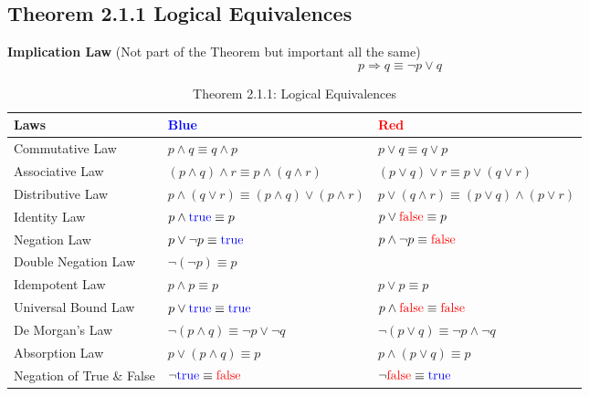 \documentclass{article}
\theoremstyle{plain}
\theoremstyle{definition}
\theoremstyle{remark}
\begin{document}
\subsection{Theorem 2.1.1 Logical Equivalences}

\textbf{Implication Law} (Not part of the Theorem but important all the same)
\[ p \Rightarrow q \equiv \neg p \vee q \]

\begin{table}[H]
    \centering
    \begin{tabular}{lll}
        \toprule
        \textbf{Laws} & \textbf{\textcolor{blue}{Blue}} & \textbf{\textcolor{red}{Red}} \\
        \midrule
        Commutative Law & $p \wedge q \equiv q \wedge p$ & $p \vee q \equiv q \vee p$ \\
        Associative Law & $(p \wedge q) \wedge r \equiv p \wedge (q \wedge r)$ & $(p \vee q) \vee r \equiv p \vee (q \vee r)$ \\
        Distributive Law & $p \wedge (q \vee r) \equiv (p \wedge q) \vee (p \wedge r)$ & $p \vee (q \wedge r) \equiv (p \vee q) \wedge (p \vee r)$ \\
        Identity Law & $p \wedge \textcolor{blue}{\text{true}} \equiv p$ & $p \vee \textcolor{red}{\text{false}} \equiv p$ \\
        Negation Law & $p \vee \neg p \equiv \textcolor{blue}{\text{true}}$ & $p \wedge \neg p \equiv \textcolor{red}{\text{false}}$ \\
        Double Negation Law & $\neg (\neg p) \equiv p$ & \\
        Idempotent Law & $p \wedge p \equiv p$ & $p \vee p \equiv p$ \\
        Universal Bound Law & $p \vee \textcolor{blue}{\text{true}} \equiv \textcolor{blue}{\text{true}}$ & $p \wedge \textcolor{red}{\text{false}} \equiv \textcolor{red}{\text{false}}$ \\
        De Morgan's Law & $\neg (p \wedge q) \equiv \neg p \vee \neg q$ & $\neg (p \vee q) \equiv \neg p \wedge \neg q$ \\
        Absorption Law & $p \vee (p \wedge q) \equiv p$ & $p \wedge (p \vee q) \equiv p$ \\
        Negation of True \& False & $\neg \textcolor{blue}{\text{true}} \equiv \textcolor{red}{\text{false}}$ & $\neg \textcolor{red}{\text{false}} \equiv \textcolor{blue}{\text{true}}$ \\
        \bottomrule
    \end{tabular}
    \caption{Theorem 2.1.1: Logical Equivalences}
    \label{tab:2.1.1}
\end{table}
\end{document}
